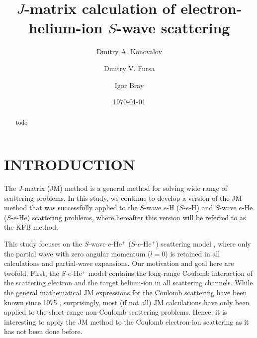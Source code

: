 \documentclass[aip
, pra
, showpacs
, aps
, twocolumn
, groupedaddress
, floatfix
]{revtex4}
\begin{document}
\title {$J$-matrix calculation of electron-helium-ion $S$-wave scattering}

\author{Dmitry A. Konovalov}

\author{Dmitry V. Fursa}

\author{Igor Bray}



\date{\today}

\begin{abstract}
todo

\end{abstract}

\maketitle



\section{INTRODUCTION}


The $J$-matrix (JM) method \cite{HY74p1201,BR76p1491} is a  general method for solving wide range of scattering problems.
In this study, we continue to develop a version of the JM method that
was successfully applied to the $S$-wave $e$-H  ($S$-$e$-H) \cite{KB10p022708}  and $S$-wave $e$-He  ($S$-$e$-He) \cite{KFB11,KFB12} scattering problems,
where hereafter this version will be referred to as the KFB method.


This study focuses on the $S$-wave $e$-He$^+$ ($S$-$e$-He$^+$) scattering model \cite{MGB95,BB97,BC97},
where only the partial wave with zero angular momentum ($l=0$) is retained in all calculations
and partial-wave expansions. Our motivation and goal here are twofold. First, the
$S$-$e$-He$^+$ model contains the long-range Coulomb interaction of the scattering electron and the target helium-ion in all scattering channels.
While the general mathematical JM expressions for the Coulomb scattering have been known since 1975 \cite{YF75}, surprisingly,
most (if not all) JM calculations have only been applied to the short-range non-Coulomb scattering problems.
Hence, it is interesting to apply the JM method to the Coulomb electron-ion scattering as it has not been done before.
\end{document}
